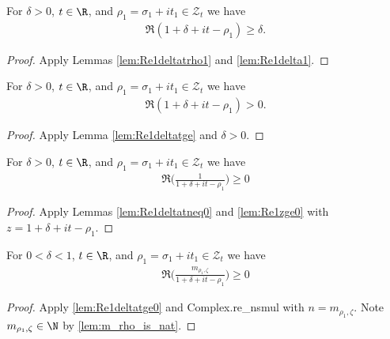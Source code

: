 \begin{lemma}\label{lem:Re1deltatge}  \leanok
For $\delta>0$, $t\in\R$, and $\rho_1=\sigma_1+it_1\in \mathcal Z_t$ we have
\begin{align*}
\Re(1+\delta+it-\rho_1) \ge \delta.
\end{align*}
\end{lemma}
\begin{proof} \leanok {}
Apply Lemmas \ref{lem:Re1deltatrho1} and \ref{lem:Re1delta1}.
\end{proof}

\begin{lemma}\label{lem:Re1deltatneq0}  \leanok
For $\delta>0$, $t\in\R$, and $\rho_1=\sigma_1+it_1\in \mathcal Z_t$ we have
\begin{align*}
\Re(1+\delta+it-\rho_1) > 0.
\end{align*}
\end{lemma}
\begin{proof} \leanok {}
Apply Lemma \ref{lem:Re1deltatge} and $\delta>0$.
\end{proof}

\begin{lemma}\label{lem:Re1deltatge0}  \leanok
For $\delta>0$, $t\in\R$, and $\rho_1=\sigma_1+it_1\in \mathcal Z_t$ we have
\begin{align*}
\Re\Big(\frac{1}{1+\delta+it-\rho_1}\Big) \ge 0
\end{align*}
\end{lemma}
\begin{proof} \leanok {}
Apply Lemmas \ref{lem:Re1deltatneq0} and \ref{lem:Re1zge0} with $z=1+\delta+it-\rho_1$.
\end{proof}

\begin{lemma}\label{lem:Re1deltatge0m}  \leanok
For $0<\delta<1$, $t\in\R$, and $\rho_1=\sigma_1+it_1\in \mathcal Z_t$ we have
\begin{align*}
\Re\Big(\frac{m_{\rho_1,\zeta}}{1+\delta+it-\rho_1}\Big) \ge 0
\end{align*}
\end{lemma}
\begin{proof}  \leanok
Apply \cref{lem:Re1deltatge0} and Complex.re\_nsmul with $n=m_{\rho_1,\zeta}$. Note $m_{\rho_1,\zeta}\in\N$ by \ref{lem:m_rho_is_nat}.
\end{proof}

